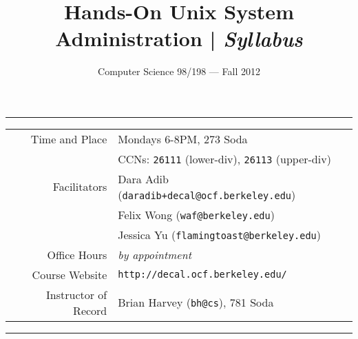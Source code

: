 \documentclass{article}
\begin{document}
\title{Hands-On {\sc Unix} System Administration | \textit{Syllabus}}
\author{Computer Science 98/198 --- Fall 2012}
\date{}
\maketitle
\thispagestyle{empty}
\pagestyle{empty} 

\hrule
\begin{center}\begin{tabular}{r | l}
	Time and Place & Mondays 6-8PM, 273 Soda \\ 
			      & CCNs: \texttt{26111} (lower-div), \texttt{26113} (upper-div) \\
	Facilitators & Dara Adib (\texttt{daradib+decal@ocf.berkeley.edu}) \\
    & Felix Wong (\texttt{waf@berkeley.edu}) \\
    & Jessica Yu (\texttt{flamingtoast@berkeley.edu}) \\
	Office Hours & \textit{by appointment} \\
	Course Website & \texttt{http://decal.ocf.berkeley.edu/} \\
	Instructor of Record & Brian Harvey (\texttt{bh@cs}), 781 Soda \\
\end{tabular}\end{center}
\hrule
\end{document}
